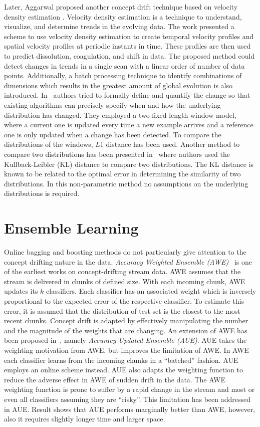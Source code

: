 Later, Aggarwal proposed another concept drift technique based on velocity density estimation \cite{aggarwal03:condrift}. Velocity density estimation is a technique to understand, visualize, and determine trends in the evolving data. The work presented a scheme to use velocity density estimation to create temporal velocity profiles and spatial velocity profiles at periodic instants in time. These profiles are then used to predict dissolution, coagulation, and shift in data. The proposed method could detect changes in trends in a single scan with a linear order of number of data points. Additionally, a batch processing technique to identify combinations of dimensions which results in the greatest amount of global evolution is also introduced. In~\cite{kifer04:condrift} authors tried to formally define and quantify the change so that existing algorithms can precisely specify when and how the underlying distribution has changed. They employed a two fixed-length window model, where a current one is updated every time a new example arrives and a reference one is only updated when a change has been detected. To compare the distributions of the windows, $L1$ distance has been used. Another method to compare two distributions has been presented in~\cite{dasu05:condrift} where authors used the Kullback-Leibler (KL) distance to compare two distributions. The KL distance is known to be related to the optimal error in determining the similarity of two distributions. In this non-parametric method no assumptions on the underlying distributions is required. 


\section*{Ensemble Learning}

Online bagging and boosting methods do not particularly give attention to the concept drifting nature in the data. \textit{Accuracy Weighted Ensemble (AWE)}~\cite{wang03:accuweighted} is one of the earliest works on concept-drifting stream data. AWE assumes that the stream is delivered in chunks of defined size. With each incoming chunk, AWE updates its $k$ classifiers. Each classifier has an associated weight which is inversely proportional to the expected error of the respective classifier. To estimate this error, it is assumed that the distribution of test set is the closest to the most recent chunks. Concept drift is adapted by effectively manipulating the number and the magnitude of the weights that are changing. An extension of AWE has been proposed in~\cite{brzezinski11:accuupdated}, namely \textit{Accuracy Updated Ensemble (AUE)}. AUE takes the weighting motivation from AWE, but improves the limitation of AWE. In AWE each classifier learns from the incoming chunks in a ``batched'' fashion. AUE employs an online scheme instead. AUE also adapts the weighting function to reduce the adverse effect in AWE of sudden drift in the data. The AWE weighting function is prone to suffer by a rapid change in the stream and most or even all classifiers assuming they are ``risky''. This limitation has been addressed in AUE. Result shows that AUE performs marginally better than AWE, however, also it requires slightly longer time and larger space.

